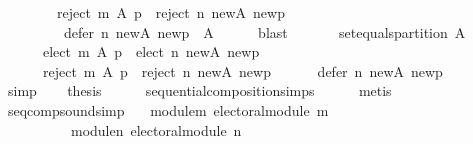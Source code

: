 \begin{isabellebody}
\ \ \ \ \ \ \ \ {\isacharparenleft}{\kern0pt}reject\ m\ A\ p\ {\isasymunion}\ reject\ n\ {\isacharquery}{\kern0pt}new{\isacharunderscore}{\kern0pt}A\ {\isacharquery}{\kern0pt}new{\isacharunderscore}{\kern0pt}p{\isacharparenright}{\kern0pt}\ {\isasymunion}\isanewline
\ \ \ \ \ \ \ \ \ defer\ n\ {\isacharquery}{\kern0pt}new{\isacharunderscore}{\kern0pt}A\ {\isacharquery}{\kern0pt}new{\isacharunderscore}{\kern0pt}p\ {\isacharequal}{\kern0pt}\ A{\isachardoublequoteclose}\isanewline
\ \ \ \ \isamarkupfalse%
\ blast\isanewline
\ \ \isamarkupfalse%
\isanewline
\ \ \ \ {\isachardoublequoteopen}set{\isacharunderscore}{\kern0pt}equals{\isacharunderscore}{\kern0pt}partition\ A\isanewline
\ \ \ \ \ \ {\isacharparenleft}{\kern0pt}elect\ m\ A\ p\ {\isasymunion}\ elect\ n\ {\isacharquery}{\kern0pt}new{\isacharunderscore}{\kern0pt}A\ {\isacharquery}{\kern0pt}new{\isacharunderscore}{\kern0pt}p{\isacharcomma}{\kern0pt}\isanewline
\ \ \ \ \ \ reject\ m\ A\ p\ {\isasymunion}\ reject\ n\ {\isacharquery}{\kern0pt}new{\isacharunderscore}{\kern0pt}A\ {\isacharquery}{\kern0pt}new{\isacharunderscore}{\kern0pt}p{\isacharcomma}{\kern0pt}\isanewline
\ \ \ \ \ \ defer\ n\ {\isacharquery}{\kern0pt}new{\isacharunderscore}{\kern0pt}A\ {\isacharquery}{\kern0pt}new{\isacharunderscore}{\kern0pt}p{\isacharparenright}{\kern0pt}{\isachardoublequoteclose}\isanewline
\ \ \ \ \isamarkupfalse%
\ simp\isanewline
\ \ \isamarkupfalse%
\ {\isacharquery}{\kern0pt}thesis\isanewline
\ \ \ \ \isamarkupfalse%
\ sequential{\isacharunderscore}{\kern0pt}composition{\isachardot}{\kern0pt}simps\isanewline
\ \ \ \ \isamarkupfalse%
\ metis\isanewline
{}\isamarkupfalse%
%
\endisatagproof
{\isafoldproof}%
%
\isadelimproof
%
\endisadelimproof
%
\isadelimdocument
%
\endisadelimdocument
%
\isatagdocument
%
\isamarkuptrue%
%
\endisatagdocument
{\isafolddocument}%
%
\isadelimdocument
%
\endisadelimdocument
{}\isamarkupfalse%
\ seq{\isacharunderscore}{\kern0pt}comp{\isacharunderscore}{\kern0pt}sound{\isacharbrackleft}{\kern0pt}simp{\isacharbrackright}{\kern0pt}{\isacharcolon}{\kern0pt}\isanewline
\ \ \ module{\isacharunderscore}{\kern0pt}m{\isacharcolon}{\kern0pt}\ {\isachardoublequoteopen}electoral{\isacharunderscore}{\kern0pt}module\ m{\isachardoublequoteclose}\ \isanewline
\ \ \ \ \ \ \ \ \ \ module{\isacharunderscore}{\kern0pt}n{\isacharcolon}{\kern0pt}\ {\isachardoublequoteopen}electoral{\isacharunderscore}{\kern0pt}module\ n{\isachardoublequoteclose}\isanewline

\end{isabellebody}
